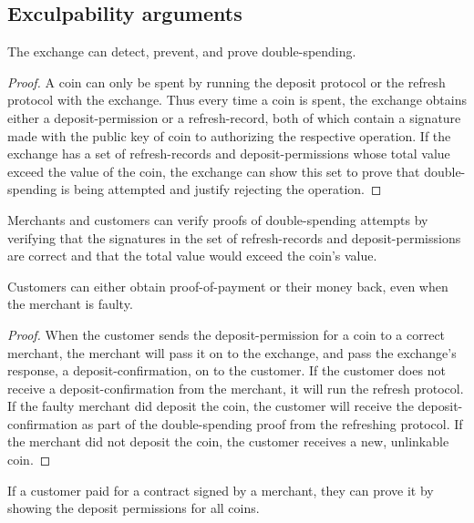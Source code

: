 \documentclass[sigconf, authordraft]{acmart}
\begin{document}
\subsection{Exculpability arguments}

\begin{lemma}\label{lemma:double-spending}
The exchange can detect, prevent, and prove double-spending.
\end{lemma}

\begin{proof}
A coin can only be spent by running the deposit protocol or the refresh
protocol with the exchange.  Thus every time a coin is spent, the exchange
obtains either a deposit-permission or a refresh-record, both of which
contain a signature made with the public key of coin to authorizing the
respective operation.  If the exchange has a set of refresh-records and
deposit-permissions whose total value exceed the value of the coin, the
exchange can show this set to prove that double-spending is being
attempted and justify rejecting the operation.
\end{proof}

\begin{corollary}
Merchants and customers can verify proofs of double-spending attempts
by verifying that the signatures in the set of refresh-records and
deposit-permissions are correct and that the total value would exceed
the coin's value.
\end{corollary}

\begin{lemma}
Customers can either obtain proof-of-payment or their money back, even
when the merchant is faulty.
\end{lemma}

\begin{proof}
When the customer sends the deposit-permission for a coin to a correct
merchant, the merchant will pass it on to the exchange, and pass the
exchange's response, a deposit-confirmation, on to the customer.  If
the customer does not receive a deposit-confirmation from the
merchant, it will run the refresh protocol.  If the faulty merchant
did deposit the coin, the customer will receive the
deposit-confirmation as part of the double-spending proof from the
refreshing protocol.  If the merchant did not deposit the coin, the
customer receives a new, unlinkable coin.
\end{proof}

\begin{corollary}
If a customer paid for a contract signed by a merchant,
they can prove it by showing the deposit permissions for all coins.
\end{corollary}
\end{document}
